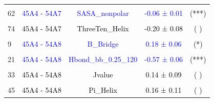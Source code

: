 \documentclass{article}\usepackage[table]{xcolor}
\renewcommand{\$}{$} %
\begin{document}
\begin{center}
\begin{longtable}[t]{lcccc}
\cellcolor{gray!6}{56} & \cellcolor{gray!6}{\textcolor{blue}{45A4 - 54A7}} & \cellcolor{gray!6}{\textcolor{blue}{RMSD.ADJ}} & \cellcolor{gray!6}{\textcolor{blue}{0.32 ± 0.08}} & \cellcolor{gray!6}{\textcolor{black}{(**)}}\\
62 & \textcolor{blue}{45A4 - 54A7} & \textcolor{blue}{SASA\_nonpolar} & \textcolor{blue}{-0.06 ± 0.01} & \textcolor{black}{(***)}\\
\cellcolor{gray!6}{68} & \cellcolor{gray!6}{\textcolor{blue}{45A4 - 54A7}} & \cellcolor{gray!6}{\textcolor{blue}{SASA\_polar}} & \cellcolor{gray!6}{\textcolor{blue}{-0.11 ± 0.02}} & \cellcolor{gray!6}{\textcolor{black}{(***)}}\\
74 & \textcolor{black}{45A4 - 54A7} & \textcolor{black}{ThreeTen\_Helix} & \textcolor{black}{-0.20 ± 0.08} & \textcolor{black}{( )}\\
\cellcolor{gray!6}{3} & \cellcolor{gray!6}{\textcolor{black}{45A4 - 54A8}} & \cellcolor{gray!6}{\textcolor{black}{A\_Helix}} & \cellcolor{gray!6}{\textcolor{black}{-0.07 ± 0.08}} & \cellcolor{gray!6}{\textcolor{black}{( )}}\\
9 & \textcolor{blue}{45A4 - 54A8} & \textcolor{blue}{B\_Bridge} & \textcolor{blue}{0.18 ± 0.06} & \textcolor{black}{(*)}\\
\cellcolor{gray!6}{15} & \cellcolor{gray!6}{\textcolor{blue}{45A4 - 54A8}} & \cellcolor{gray!6}{\textcolor{blue}{B\_Strand}} & \cellcolor{gray!6}{\textcolor{blue}{0.45 ± 0.08}} & \cellcolor{gray!6}{\textcolor{black}{(***)}}\\
21 & \textcolor{blue}{45A4 - 54A8} & \textcolor{blue}{Hbond\_bb\_0.25\_120} & \textcolor{blue}{-0.57 ± 0.06} & \textcolor{black}{(***)}\\
\cellcolor{gray!6}{27} & \cellcolor{gray!6}{\textcolor{blue}{45A4 - 54A8}} & \cellcolor{gray!6}{\textcolor{blue}{Hbond\_native\_bb\_0.25\_120}} & \cellcolor{gray!6}{\textcolor{blue}{-0.90 ± 0.08}} & \cellcolor{gray!6}{\textcolor{black}{(***)}}\\
33 & \textcolor{black}{45A4 - 54A8} & \textcolor{black}{Jvalue} & \textcolor{black}{0.14 ± 0.09} & \textcolor{black}{( )}\\
\cellcolor{gray!6}{39} & \cellcolor{gray!6}{\textcolor{black}{45A4 - 54A8}} & \cellcolor{gray!6}{\textcolor{black}{NOE\_repl\_merged}} & \cellcolor{gray!6}{\textcolor{black}{0.03 ± 0.05}} & \cellcolor{gray!6}{\textcolor{black}{( )}}\\
45 & \textcolor{black}{45A4 - 54A8} & \textcolor{black}{Pi\_Helix} & \textcolor{black}{0.16 ± 0.11} & \textcolor{black}{( )}\\

\end{longtable}
\end{center}
\end{document}
